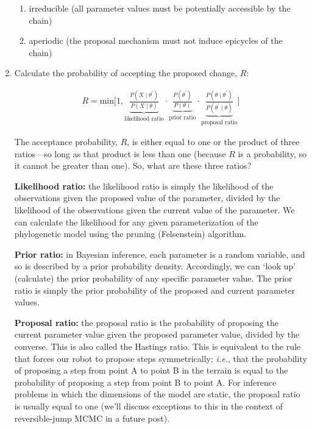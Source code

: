 \begin{enumerate}
{\begin{enumerate}
\item{irreducible (all parameter values must be potentially accessible by the chain)}

\item{aperiodic (the proposal mechanism must not induce epicycles of the chain)}
\end{enumerate}}

\item{Calculate the probability of accepting the proposed change, $R$:

\begin{align}
R = \text{min}\Bigg[1, \underbrace{\frac{P(X \mid \theta ^{\prime})}{P(X \mid \theta )}}_{\text{likelihood ratio}} \cdot \underbrace{\frac{ P(\theta ^{\prime})}{P(\theta)}}_\text{prior ratio} \cdot \underbrace{\frac{P(\theta \mid \theta ^{\prime})}{P(\theta ^{\prime} \mid \theta)}}_\text{proposal ratio} \Bigg]
\end{align}

The acceptance probability, $R$, is either equal to one or the product of three ratios—so long as that product is less than one (because $R$ is a probability, so it cannot be greater than one). 
So, what are these three ratios?

\textbf{Likelihood ratio:} the likelihood ratio is simply the likelihood of the observations given the proposed value of the parameter, divided by the likelihood of the observations given the current value of the parameter. 
We can calculate the likelihood for any given parameterization of the phylogenetic model using the pruning (Felsenstein) algorithm.

\textbf{Prior ratio:} in Bayesian inference, each parameter is a random variable, and so is described by a prior probability density. 
Accordingly, we can `look up' (calculate) the prior probability of any specific parameter value. 
The prior ratio is simply the prior probability of the proposed and current parameter values.

\textbf{Proposal ratio:} the proposal ratio is the probability of proposing the current parameter value given the proposed parameter value, divided by the converse. 
This is also called the Hastings ratio. 
This is equivalent to the rule that forces our robot to propose steps symmetrically; {\it i.e.}, that the probability of proposing a step from point A to point B in the terrain is equal to the probability of proposing a step from point B to point A. 
For inference problems in which the dimensions of the model are static, the proposal ratio is usually equal to one (we'll discuss exceptions to this in the context of reversible-jump MCMC in a future post).

}
\end{enumerate}
